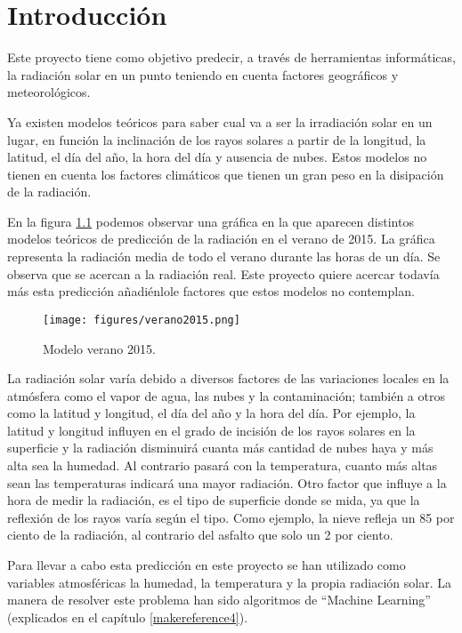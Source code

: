 \cleardoublepage

\chapter{Introducción}
\label{makereference}

Este proyecto tiene como objetivo predecir, a través de herramientas informáticas, la radiación solar en un punto teniendo en cuenta factores geográficos y meteorológicos.

Ya existen modelos teóricos para saber cual va a ser la irradiación solar en un lugar, en función la inclinación de los rayos solares a partir de la longitud, la latitud, el día del año, la hora del día y ausencia de nubes. Estos modelos no tienen en cuenta los factores climáticos que tienen un gran peso en la disipación de la radiación.

En la figura \ref{modelo_verano} podemos observar una gráfica en la que aparecen distintos modelos teóricos de predicción de la radiación en el verano de 2015. La gráfica representa la radiación media de todo el verano durante las horas de un día. Se observa que se acercan a la radiación real. Este proyecto quiere acercar todavía más esta predicción añadiénlole factores que estos modelos no contemplan.

\begin{figure}[htb]
	\begin{center}
		\texttt{[image: figures/verano2015.png]}
		\caption{Modelo verano 2015. \label{modelo_verano}} 
	\end{center}
\end{figure}

La radiación solar varía debido a diversos factores de las variaciones locales en la atmósfera como el vapor de agua, las nubes y la contaminación; también a otros como la latitud y longitud, el día del año y la hora del día. Por ejemplo, la latitud y longitud influyen en el grado de incisión de los rayos solares en la superficie y la radiación disminuirá cuanta más cantidad de nubes haya y más alta sea la humedad. Al contrario pasará con la temperatura, cuanto más altas sean las temperaturas indicará una mayor radiación. Otro factor que influye a la hora de medir la radiación, es el tipo de superficie donde se mida, ya que la reflexión de los rayos varía según el tipo. Como ejemplo, la nieve refleja un 85 por ciento de la radiación, al contrario del asfalto que solo un 2 por ciento.

Para llevar a cabo esta predicción en este proyecto se han utilizado como variables atmosféricas la humedad, la temperatura y la propia radiación solar. La manera de resolver este problema han sido algoritmos de ``Machine Learning'' (explicados en el capítulo \ref{makereference4}).

